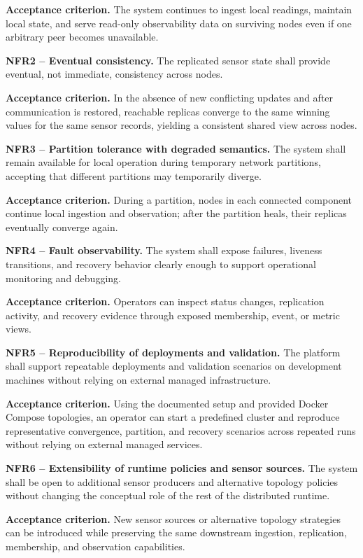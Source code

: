 \textbf{Acceptance criterion.}
The system continues to ingest local readings, maintain local state, and serve read-only observability data on surviving nodes even if one arbitrary peer becomes unavailable.

\medskip
\textbf{NFR2 -- Eventual consistency.}
The replicated sensor state shall provide eventual, not immediate, consistency across nodes.

\textbf{Acceptance criterion.}
In the absence of new conflicting updates and after communication is restored, reachable replicas converge to the same winning values for the same sensor records, yielding a consistent shared view across nodes.

\medskip
\textbf{NFR3 -- Partition tolerance with degraded semantics.}
The system shall remain available for local operation during temporary network partitions, accepting that different partitions may temporarily diverge.

\textbf{Acceptance criterion.}
During a partition, nodes in each connected component continue local ingestion and observation; after the partition heals, their replicas eventually converge again.

\medskip
\textbf{NFR4 -- Fault observability.}
The system shall expose failures, liveness transitions, and recovery behavior clearly enough to support operational monitoring and debugging.

\textbf{Acceptance criterion.}
Operators can inspect status changes, replication activity, and recovery evidence through exposed membership, event, or metric views.

\medskip
\textbf{NFR5 -- Reproducibility of deployments and validation.}
The platform shall support repeatable deployments and validation scenarios on development machines without relying on external managed infrastructure.

\textbf{Acceptance criterion.}
Using the documented setup and provided Docker Compose topologies, an operator can start a predefined cluster and reproduce representative convergence, partition, and recovery scenarios across repeated runs without relying on external managed services.

\medskip
\textbf{NFR6 -- Extensibility of runtime policies and sensor sources.}
The system shall be open to additional sensor producers and alternative topology policies without changing the conceptual role of the rest of the distributed runtime.

\textbf{Acceptance criterion.}
New sensor sources or alternative topology strategies can be introduced while preserving the same downstream ingestion, replication, membership, and observation capabilities.

